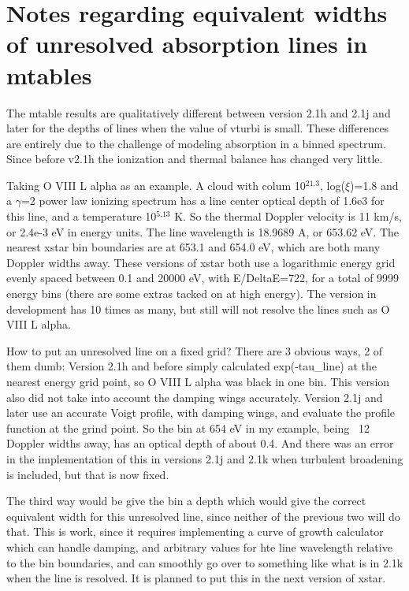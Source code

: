 \section{Notes regarding equivalent widths of unresolved absorption lines in mtables}

The mtable results are qualitatively different between version 2.1h and 2.1j and later
for the depths of lines when the value of vturbi is small.
These differences are entirely due to the challenge of modeling absorption
in a binned spectrum.  Since before v2.1h the ionization and thermal
balance has changed very little.  

Taking O VIII L alpha as an example.  A cloud with colum 10$^{21.3}$,
log($\xi$)=1.8 and a $\gamma$=2 power law ionizing spectrum has a line center
optical depth of 1.6e3 for this line, and a temperature 10$^{5.13}$ K.  So the
thermal Doppler velocity is 11 km/s, or 2.4e-3 eV in energy units.  The
line wavelength is 18.9689 A, or 653.62 eV.  The nearest xstar bin
boundaries are at 653.1 and 654.0 eV, which are both many Doppler widths
away.  These versions of xstar both use a logarithmic energy grid evenly
spaced between 0.1 and 20000 eV, with E/DeltaE=722, for a total of 9999
energy bins (there are some extras tacked on at high energy). The version
in development has 10 times as many, but still will not resolve the lines
such as O VIII L alpha.

How to put an unresolved line on a fixed grid?  There are  3 obvious ways, 2
of them dumb: Version 2.1h and before simply calculated exp(-tau\_line) at
the nearest energy grid point, so O VIII L alpha was black in one bin.
This version also did not take into account the damping wings accurately.
Version 2.1j and later use an accurate Voigt profile, with damping wings,
and evaluate the profile function at the grind point.  So the bin at 654
eV in my example, being ~12 Doppler widths away, has an optical depth of
about 0.4.  And there was an error in the implementation of this in
versions 2.1j and 2.1k when turbulent broadening is included, but that is
now fixed.

The third way would be give the bin a depth which would give the correct 
equivalent width for this unresolved line, since neither of the previous
two will do that.  This is work, since it requires implementing a curve
of growth calculator which can handle damping, and arbitrary values for
hte line wavelength relative to the bin boundaries, and can smoothly go
over to something like what is in 2.1k when the line is resolved.  It 
is planned to put this in the next version of xstar.  

